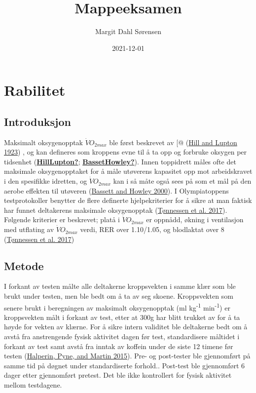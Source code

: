 \documentclass[
]{book}
\title{Mappeeksamen}
\author{Margit Dahl Sørensen}
\date{2021-12-01}
\begin{document}
\frontmatter
\maketitle

\mainmatter
\hypertarget{rabilitet}{%
\chapter{Rabilitet}\label{rabilitet}}

\hypertarget{introduksjon}{%
\section{Introduksjon}\label{introduksjon}}

Maksimalt oksygenopptak \(\dot VO_{2max}\) ble først beskrevet av {[}@
(\protect\hyperlink{ref-hill1923}{Hill and Lupton 1923}) , og kan
defineres som kroppens evne til å ta opp og forbruke oksygen per
tidsenhet (\protect\hyperlink{ref-HillLupton}{\textbf{HillLupton?}};
\protect\hyperlink{ref-BassetHowley}{\textbf{BassetHowley?}}). Innen
toppidrett måles ofte det maksimale oksygenopptaket for å måle utøverens
kapasitet opp mot arbeidskravet i den spesifikke idretten, og
\(\dot VO_{2max}\) kan i så måte også sees på som et mål på den aerobe
effekten til utøveren (\protect\hyperlink{ref-bassett2000}{Bassett and
Howley 2000}). I Olympiatoppens testprotokoller benytter de flere
definerte hjelpekriterier for å sikre at man faktisk har funnet
deltakerens maksimale oksygenopptak
(\protect\hyperlink{ref-tuxf8nnessen2017}{Tønnessen et al. 2017}).
Følgende kriterier er beskrevet; platå i \(\dot VO_{2max}\) er oppnådd,
økning i ventilasjon med utflating av \(\dot VO_{2max}\) verdi, RER over
1.10/1.05, og blodlaktat over 8
(\protect\hyperlink{ref-tuxf8nnessen2017}{Tønnessen et al. 2017})

\hypertarget{metode}{%
\section{Metode}\label{metode}}

I forkant av testen målte alle deltakerne kroppsvekten i samme klær som
ble brukt under testen, men ble bedt om å ta av seg skoene. Kroppsvekten
som senere brukt i beregningen av maksimalt oksygenopptak (ml
kg\textsuperscript{-1} min\textsuperscript{-1}) er kroppsvekten målt i
forkant av test, etter at 300g har blitt trukket av for å ta høyde for
vekten av klærne. For å sikre intern validitet ble deltakerne bedt om å
avstå fra anstrengende fysisk aktivitet dagen før test, standardisere
måltidet i forkant av test samt avstå fra inntak av koffein under de
siste 12 timene før testen
(\protect\hyperlink{ref-halperin2015}{Halperin, Pyne, and Martin 2015}).
Pre- og post-tester ble gjennomført på samme tid på døgnet under
standardiserte forhold.. Post-test ble gjennomført 6 dager etter
gjennomført pretest. Det ble ikke kontrollert for fysisk aktivitet
mellom testdagene.
\end{document}
